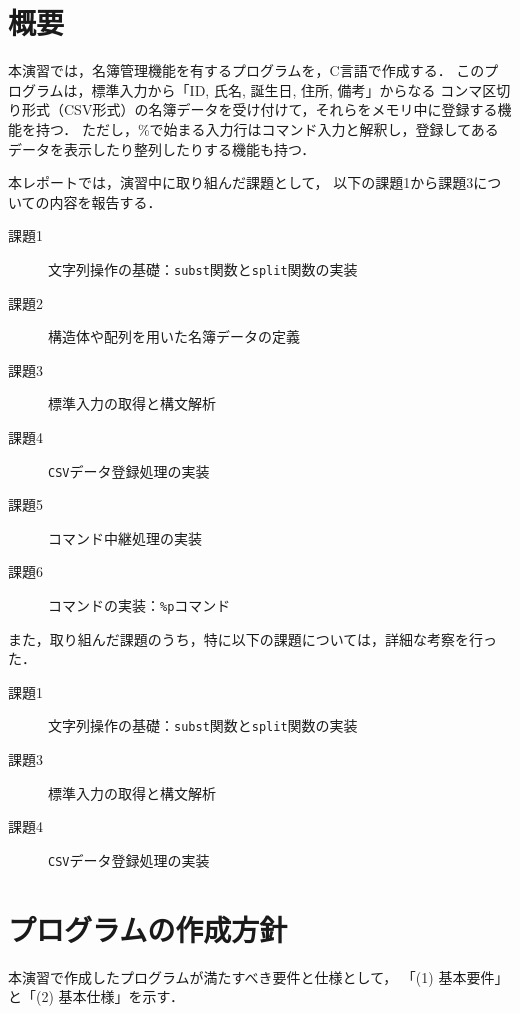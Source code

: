 \section{概要} \label{sec:abstract}

本演習では，名簿管理機能を有するプログラムを，C言語で作成する．
このプログラムは，標準入力から「ID, 氏名, 誕生日, 住所, 備考」からなる
コンマ区切り形式（CSV形式）の名簿データを受け付けて，それらをメモリ中に登録する機能を持つ．
ただし，\%で始まる入力行はコマンド入力と解釈し，登録してあるデータを表示したり整列したりする機能も持つ．

本レポートでは，演習中に取り組んだ課題として，
以下の課題1から課題3についての内容を報告する．
%
\begin{description}
  \item[課題1] 文字列操作の基礎：\verb|subst|関数と\verb|split|関数の実装
  \item[課題2] 構造体や配列を用いた名簿データの定義
  \item[課題3] 標準入力の取得と構文解析
  \item[課題4] \verb|CSV|データ登録処理の実装
  \item[課題5] コマンド中継処理の実装
  \item[課題6] コマンドの実装：\verb|%p|コマンド
\end{description}
%
また，取り組んだ課題のうち，特に以下の課題については，詳細な考察を行った．
%
\begin{description}
  \item[課題1] 文字列操作の基礎：\verb|subst|関数と\verb|split|関数の実装
  \item[課題3] 標準入力の取得と構文解析
  \item[課題4] \verb|CSV|データ登録処理の実装
\end{description}


\section{プログラムの作成方針}\label{sec:plan}

本演習で作成したプログラムが満たすべき要件と仕様として，
「(1) 基本要件」と「(2) 基本仕様」を示す．

